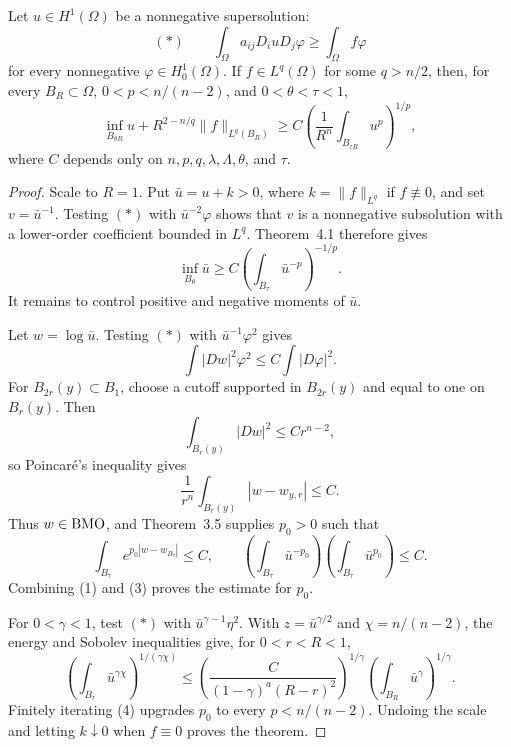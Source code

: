 \begin{theorem}\label{hanlin:weaksol-part2-weak-harnack}
Let $u\in H^1(\Omega)$ be a nonnegative supersolution:
\[
(*)\qquad
\int_\Omega a_{ij}D_i uD_j\varphi
\geq\int_\Omega f\varphi
\]
for every nonnegative $\varphi\in H^1_0(\Omega)$. If
$f\in L^q(\Omega)$ for some $q>n/2$, then, for every
$B_R\subset\Omega$, $0<p<n/(n-2)$, and $0<\theta<\tau<1$,
\[
\inf_{B_{\theta R}}u+R^{2-n/q}\|f\|_{L^q(B_R)}
\geq C\left(\frac1{R^n}\int_{B_{\tau R}}u^p\right)^{1/p},
\]
where $C$ depends only on $n,p,q,\lambda,\Lambda,\theta$, and $\tau$.
\end{theorem}
\begin{proof}
\sketch Scale to $R=1$. Put $\bar u=u+k>0$, where
$k=\|f\|_{L^q}$ if $f\not\equiv0$, and set $v=\bar u^{-1}$. Testing $(*)$
with $\bar u^{-2}\varphi$ shows that $v$ is a nonnegative subsolution with
a lower-order coefficient bounded in $L^q$. Theorem~4.1 therefore gives
\[
\inf_{B_\theta}\bar u
\geq C\left(\int_{B_\tau}\bar u^{-p}\right)^{-1/p}.
\tag{1}
\]
It remains to control positive and negative moments of $\bar u$.

Let $w=\log\bar u$. Testing $(*)$ with $\bar u^{-1}\varphi^2$ gives
\[
\int|Dw|^2\varphi^2\leq C\int|D\varphi|^2.
\tag{2}
\]
For $B_{2r}(y)\subset B_1$, choose a cutoff supported in $B_{2r}(y)$ and
equal to one on $B_r(y)$. Then
\[
\int_{B_r(y)}|Dw|^2\leq Cr^{n-2},
\]
so Poincar\'e's inequality gives
\[
\frac1{r^n}\int_{B_r(y)}|w-w_{y,r}|\leq C.
\]
Thus $w\in\mathrm{BMO}$, and Theorem~3.5 supplies $p_0>0$ such that
\[
\int_{B_\tau}e^{p_0|w-w_{B_\tau}|}\leq C,
\qquad
\left(\int_{B_\tau}\bar u^{-p_0}\right)
\left(\int_{B_\tau}\bar u^{p_0}\right)\leq C.
\tag{3}
\]
Combining (1) and (3) proves the estimate for $p_0$.

For $0<\gamma<1$, test $(*)$ with $\bar u^{\gamma-1}\eta^2$. With
$z=\bar u^{\gamma/2}$ and $\chi=n/(n-2)$, the energy and Sobolev
inequalities give, for $0<r<R<1$,
\[
\left(\int_{B_r}\bar u^{\gamma\chi}\right)^{1/(\gamma\chi)}
\leq
\left(\frac{C}{(1-\gamma)^a(R-r)^2}\right)^{1/\gamma}
\left(\int_{B_R}\bar u^\gamma\right)^{1/\gamma}.
\tag{4}
\]
Finitely iterating (4) upgrades $p_0$ to every
$p<n/(n-2)$. Undoing the scale and letting $k\downarrow0$ when
$f\equiv0$ proves the theorem.
\end{proof}

